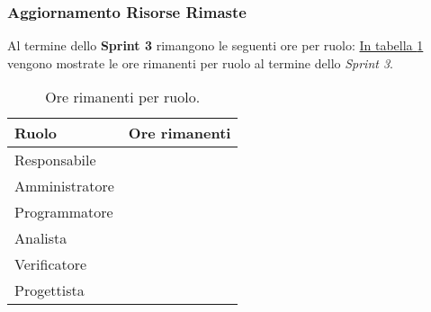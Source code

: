 \subsubsection{Aggiornamento Risorse Rimaste}
Al termine dello \textbf{Sprint 3} rimangono le seguenti ore per ruolo: \hyperref[tab:sprint3_ore_rimanenti]{In tabella \ref{tab:sprint3_ore_rimanenti}} vengono mostrate le ore rimanenti per ruolo al termine dello \textit{Sprint 3}.

\begin{table}[H]
    \centering
    \begin{tabular}{| l | l |}
    \hline
    \textbf{Ruolo} & 
    \textbf{Ore rimanenti}\\
    \hline
        Responsabile & \\
    \hline
        Amministratore & \\
    \hline
        Programmatore & \\
    \hline
        Analista & \\
    \hline
        Verificatore & \\
    \hline
        Progettista & \\
    \hline
    \end{tabular}
    \caption{Ore rimanenti per ruolo.}
    \label{tab:sprint3_ore_rimanenti} 
\end{table}